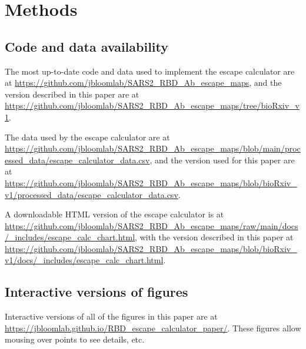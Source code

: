 \documentclass[9pt,twocolumn,twoside]{gsajnl_modified}
\begin{document}
{\small

\section{Methods}
\subsection{Code and data availability}
The most up-to-date code and data used to implement the escape calculator are at \url{https://github.com/jbloomlab/SARS2_RBD_Ab_escape_maps}, and the version described in this paper are at \url{https://github.com/jbloomlab/SARS2_RBD_Ab_escape_maps/tree/bioRxiv_v1}.

The data used by the escape calculator are at \url{https://github.com/jbloomlab/SARS2_RBD_Ab_escape_maps/blob/main/processed_data/escape_calculator_data.csv}, and the version used for this paper are at \url{https://github.com/jbloomlab/SARS2_RBD_Ab_escape_maps/blob/bioRxiv_v1/processed_data/escape_calculator_data.csv}.

A downloadable HTML version of the escape calculator is at \url{https://github.com/jbloomlab/SARS2_RBD_Ab_escape_maps/raw/main/docs/_includes/escape_calc_chart.html}, with the version described in this paper at \url{https://github.com/jbloomlab/SARS2_RBD_Ab_escape_maps/blob/bioRxiv_v1/docs/_includes/escape_calc_chart.html}.

\subsection{Interactive versions of figures}
Interactive versions of all of the figures in this paper are at \url{https://jbloomlab.github.io/RBD_escape_calculator_paper/}.
These figures allow mousing over points to see details, etc.

}
\end{document}

